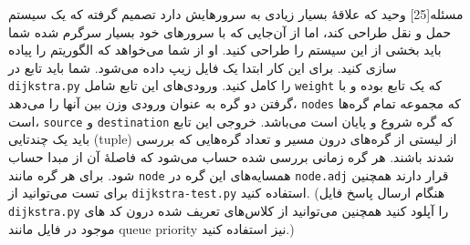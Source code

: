 ‌مسئله[25]
وحید که علاقۀ بسیار زیادی به سرورهایش دارد تصمیم گرفته که یک سیستم حمل و نقل طراحی کند، اما از آن‌جایی که با سرورهای خود بسیار سرگرم شده  شما باید بخشی از این سیستم را طراحی کنید. او از شما می‌خواهد که الگوریتم  را پیاده سازی کنید. برای این کار ابتدا یک فایل زیپ داده می‌شود. شما باید تابع  در \texttt{dijkstra.py} را کامل کنید. ورودی‌های این تابع شامل \texttt{weight} که یک تابع بوده و با گرفتن دو گره به عنوان ورودی وزن بین آنها را می‌دهد، \texttt{nodes} که مجموعه تمام گره‌ها است، \texttt{source} و \texttt{destination} که گره شروع و پایان است می‌باشد. خروجی این تابع باید یک چندتایی (tuple) از لیستی از گره‌های درون مسیر و تعداد گره‌هایی که بررسی شدند باشند. هر گره زمانی بررسی شده حساب می‌شود که فاصلۀ آن از مبدا حساب شود. برای هر گره مانند \texttt{node} همسایه‌های این گره در \texttt{node.adj} قرار دارند همچنین برای تست می‌توانید از \texttt{dijkstra-test.py} استفاده کنید.
(هنگام ارسال پاسخ فایل \texttt{dijkstra.py} را آپلود کنید همچنین می‌توانید از کلاس‌های تعریف شده درون کد های موجود در فایل مانند queue priority نیز استفاده کنید.)










